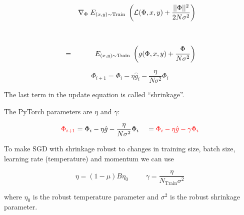 {

\begin{eqnarray*}
  & & \nabla_\Phi \;E_{(x,y) \sim \mathrm{Train}}\;\left({\cal L}(\Phi,x,y) + \frac{||\Phi||^2}{2N\sigma^2}\right) \\
  \\
  \\
  & = & E_{(x,y) \sim \mathrm{Train}} \;\left(g(\Phi,x,y) + \frac{\Phi}{N\sigma^2}\right)
\end{eqnarray*}

\vfill
$$\Phi_{i+1} = \Phi_i - \eta\hat{g}_i  - \frac{\eta}{N\sigma^2}\Phi_i$$

\vfill
The last term in the update equation is called ``shrinkage''.


The PyTorch parameters are $\eta$ and $\gamma$:

$${\color{red} \Phi_{i+1}} = \Phi_i - \eta\hat{g} - \frac{\eta}{N\sigma^2}\Phi_i\;\;\;\; = {\color{red} \Phi_i - \eta\hat{g} - \gamma\Phi_i}$$

\vfill
To make SGD with shrinkage robust to changes in training size, batch size, learning rate (temperature) and momentum we can use

\vfill
{\color{red} $$\eta = (1-\mu)B\eta_0\;\;\;\;\;\;\;\;\;\gamma = \frac{\eta}{N_{\mathrm{Train}}\sigma^2}$$}

\vfill
where $\eta_0$ is the robust temperature parameter and $\sigma^2$ is the robust shrinkage parameter.


}

